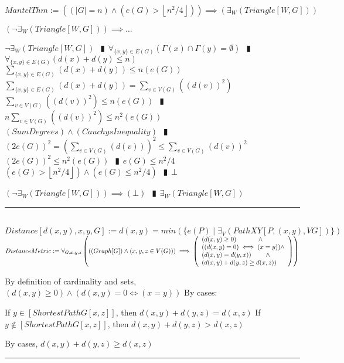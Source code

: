 \documentclass{book}
\newcommand{\abr}{:=}
\newcommand{\pipe}{$\phantom{(}\vrectangleblack\phantom{)}$}
\newcommand{\pr}[1]{\left(#1\right)}
\newcommand{\st}{\mathbin{|}}
\newcommand{\utup}[1]{\{#1\}}
\newcommand{\floor}[1]{\left\lfloor #1 \right\rfloor}
\begin{document}
$MantelThm \abr ((|G| = n) \land (e(G) > \floor{n^2 / 4})) \implies (\exists_{W}(Triangle[W, G]))$
\begin{enumerate}
  \lit $(\lnot \exists_{W}(Triangle[W, G])) \implies \ldots$
  \begin{enumerate}
    \lit $\lnot \exists_{W}(Triangle[W, G])$ \pipe $\forall_{\utup{x, y} \in E(G)}(\Gamma(x) \cap \Gamma(y) = \emptyset)$ \pipe $\forall_{\utup{x, y} \in E(G)}(d(x) + d(y) \leq n)$
    \lit $\sum \limits_{\utup{x, y} \in E(G)}^{ }(d(x) + d(y)) \leq n (e(G))$
    \lit $\sum \limits_{\utup{x, y} \in E(G)}^{ }(d(x) + d(y)) = \sum \limits_{v \in V(G)}^{ }((d(v))^2)$
    \lit $\sum \limits_{v \in V(G)}^{ }((d(v))^2) \leq n (e(G))$ \pipe $n \sum \limits_{v \in V(G)}^{ }((d(v))^2) \leq n^2 (e(G))$
    \lit $(SumDegrees) \land (CauchysInequality)$ \pipe $(2 e(G))^2 = (\sum \limits_{v \in V(G)}(d(v)))^2 \leq \sum \limits_{v \in V(G)}(d(v))^2$ %
    \lit $(2 e(G))^2 \leq n^2 (e(G))$ \pipe $e(G) \leq n^2 /4$
    \lit $(e(G) > \floor{n^2 / 4}) \land (e(G) \leq n^2 /4)$ \pipe $\bot$
  \end{enumerate}
  \lit $(\lnot \exists_{W}(Triangle[W, G])) \implies (\bot)$ \pipe $\exists_{W}(Triangle[W, G])$
\end{enumerate} \vspace{.75mm} \hrule \vspace{.75mm} \ \\ 

$Distance[d(x, y), x, y, G] \abr d(x, y) = min(\{e(P) \st \exists_{V}(PathXY[P, (x, y), V G])\})$ \\
$DistanceMetric \abr \forall_{G, x, y, z}\pr{((Graph[G]) \land (x, y, z \in V(G))) \implies 
\left(\begin{array}{ll}
  (d(x, y) \geq 0) \hfill \land \hfill \\
  ((d(x, y) = 0) \iff (x = y)) \hfill \land \hfill \\
  (d(x, y) = d(y, x)) \hfill \land \hfill \\
  (d(x, y) + d(y, z) \geq d(x, z)) \\
\end{array}\right)}$ \\
\begin{enumerate}
  \lit By definition of cardinality and sets, $(d(x, y) \geq 0) \land (d(x, y) = 0 \iff (x = y))$
  \lit By cases:
  \begin{enumerate}
    \lit If $y \in [ShortestPathG[x, z]]$, then $d(x, y) + d(y, z) = d(x, z)$
    \lit If $y \notin [ShortestPathG[x, z]]$, then $d(x, y) + d(y, z) > d(x, z)$
  \end{enumerate}
  \lit By cases, $d(x, y) + d(y, z) \geq d(x, z)$
\end{enumerate} \vspace{.75mm} \hrule \vspace{.75mm} \ \\
\end{document}
